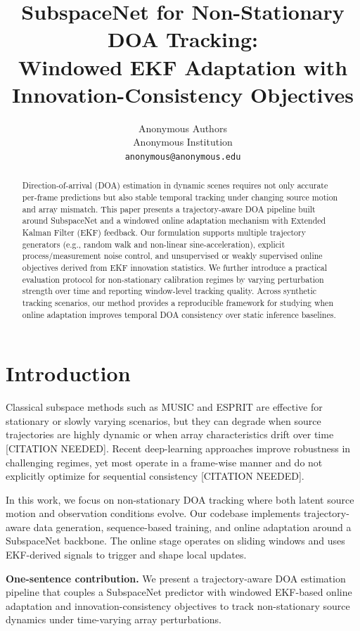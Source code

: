 \documentclass{article}
\title{SubspaceNet for Non-Stationary DOA Tracking:\\
Windowed EKF Adaptation with Innovation-Consistency Objectives}
\author{Anonymous Authors\\
Anonymous Institution\\
\texttt{anonymous@anonymous.edu}}
\begin{document}
\maketitle

\begin{abstract}
Direction-of-arrival (DOA) estimation in dynamic scenes requires not only accurate per-frame predictions but also stable temporal tracking under changing source motion and array mismatch.
This paper presents a trajectory-aware DOA pipeline built around SubspaceNet and a windowed online adaptation mechanism with Extended Kalman Filter (EKF) feedback.
Our formulation supports multiple trajectory generators (e.g., random walk and non-linear sine-acceleration), explicit process/measurement noise control, and unsupervised or weakly supervised online objectives derived from EKF innovation statistics.
We further introduce a practical evaluation protocol for non-stationary calibration regimes by varying perturbation strength over time and reporting window-level tracking quality.
Across synthetic tracking scenarios, our method provides a reproducible framework for studying when online adaptation improves temporal DOA consistency over static inference baselines.
\end{abstract}

\section{Introduction}
Classical subspace methods such as MUSIC and ESPRIT are effective for stationary or slowly varying scenarios, but they can degrade when source trajectories are highly dynamic or when array characteristics drift over time [CITATION NEEDED].
Recent deep-learning approaches improve robustness in challenging regimes, yet most operate in a frame-wise manner and do not explicitly optimize for sequential consistency [CITATION NEEDED].

In this work, we focus on non-stationary DOA tracking where both latent source motion and observation conditions evolve.
Our codebase implements trajectory-aware data generation, sequence-based training, and online adaptation around a SubspaceNet backbone.
The online stage operates on sliding windows and uses EKF-derived signals to trigger and shape local updates.

\textbf{One-sentence contribution.}
We present a trajectory-aware DOA estimation pipeline that couples a SubspaceNet predictor with windowed EKF-based online adaptation and innovation-consistency objectives to track non-stationary source dynamics under time-varying array perturbations.
\end{document}
